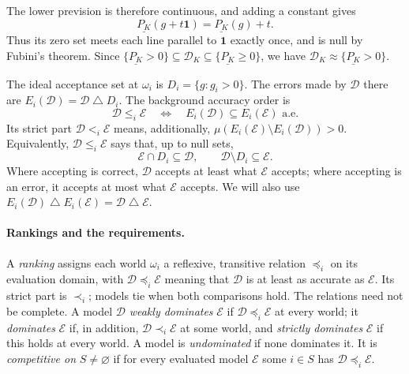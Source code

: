 \documentclass[11pt]{article}
\theoremstyle{remark}
\newcommand{\one}{\mathbf 1}
\newcommand{\sd}{\mathbin{\triangle}}
\newcommand{\Dscr}{\mathcal D}
\newcommand{\Escr}{\mathcal E}
\newcommand{\lpr}[1]{\underline{P_{#1}}}
\begin{document}
The lower prevision is therefore continuous, and adding a constant gives
\begin{equation}
 \lpr{K}(g+t\one)=\lpr{K}(g)+t.\label{eq:constant}
\end{equation}
Thus its zero set meets each line parallel to $\one$ exactly once, and is null
by Fubini's theorem. Since
$\{\lpr{K}>0\}\subseteq \Dscr_{K}\subseteq\{\lpr{K}\ge0\}$, we have
$\Dscr_{K}\approx\{\lpr{K}>0\}$.

The ideal acceptance set at $\omega_i$ is $D_i=\{g:g_i>0\}$.
The errors made by $\Dscr$ there are $E_i(\Dscr)=\Dscr\sd D_i$.
The background accuracy order is
\[
 \Dscr\le_i\Escr\quad\Longleftrightarrow\quad E_i(\Dscr)\subseteq E_i(\Escr)\text{ a.e.}
\]
Its strict part $\Dscr<_i\Escr$ means, additionally,
$\mu(E_i(\Escr)\setminus E_i(\Dscr))>0$. Equivalently, $\Dscr\le_i\Escr$ says that, up to
null sets,
\begin{equation}
 \Escr\cap D_i\subseteq \Dscr,\qquad \Dscr\setminus D_i\subseteq \Escr.\label{eq:acceptance}
\end{equation}
Where accepting is correct, $\Dscr$ accepts at least what $\Escr$ accepts; where
accepting is an error, it accepts at most what $\Escr$ accepts. We will also use
$E_i(\Dscr)\sd E_i(\Escr)=\Dscr\sd \Escr$.

\paragraph{Rankings and the requirements.}
A \emph{ranking} assigns each world $\omega_i$ a reflexive, transitive relation
$\preceq_i$ on its evaluation domain, with $\Dscr\preceq_i\Escr$ meaning that $\Dscr$
is at least as accurate as $\Escr$. Its strict part is $\prec_i$; models tie
when both comparisons hold. The relations need not be complete.
A model $\Dscr$ \emph{weakly dominates} $\Escr$ if $\Dscr\preceq_i\Escr$ at every world;
it \emph{dominates} $\Escr$ if, in addition, $\Dscr\prec_i\Escr$ at some world, and
\emph{strictly dominates} $\Escr$ if this holds at every world. A model is
\emph{undominated} if none dominates it. It is \emph{competitive on}
$S\ne\varnothing$ if for every evaluated model $\Escr$ some $i\in S$ has
$\Dscr\preceq_i\Escr$.
\end{document}
